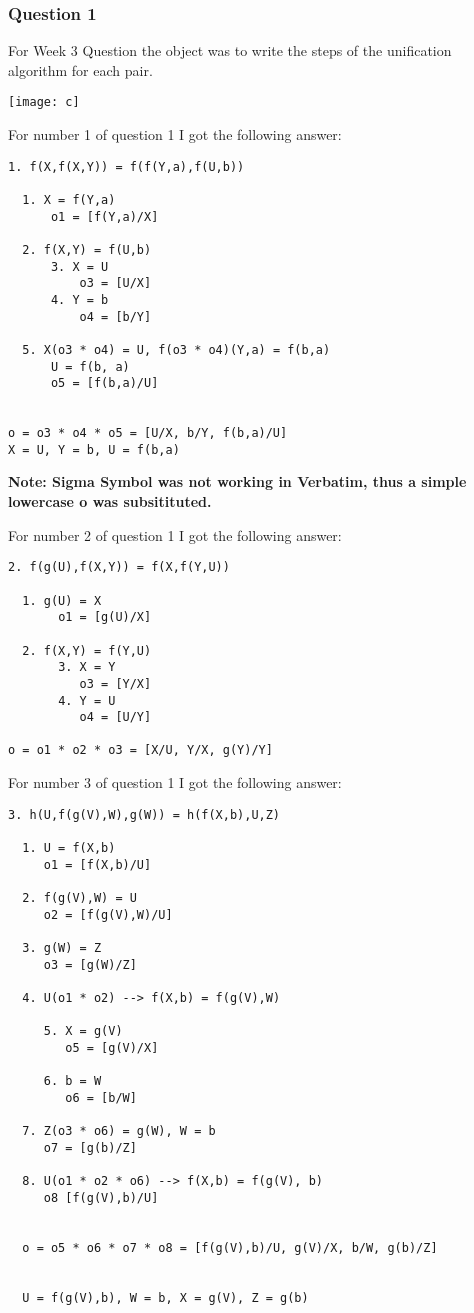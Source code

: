 \documentclass{article}
\theoremstyle{theorem}
\theoremstyle{definition}
\theoremstyle{remark}
\begin{document}
\subsubsection{Question 1}
For Week 3 Question the object was to write the steps of the unification algorithm for each pair. \newline

\texttt{[image: c]}\noindent\newline

\noindent\newline For number 1 of question 1 I got the following answer:

\begin{verbatim}
1. f(X,f(X,Y)) = f(f(Y,a),f(U,b))

  1. X = f(Y,a)
      o1 = [f(Y,a)/X]

  2. f(X,Y) = f(U,b)
      3. X = U
          o3 = [U/X]
      4. Y = b
          o4 = [b/Y]

  5. X(o3 * o4) = U, f(o3 * o4)(Y,a) = f(b,a)
      U = f(b, a)
      o5 = [f(b,a)/U]


o = o3 * o4 * o5 = [U/X, b/Y, f(b,a)/U]
X = U, Y = b, U = f(b,a)
\end{verbatim}

\noindent\textbf{Note: Sigma Symbol was not working in Verbatim, thus a simple lowercase o was subsitituted.}

\noindent\newline\newline For number 2 of question 1 I got the following answer:

\begin{verbatim}
2. f(g(U),f(X,Y)) = f(X,f(Y,U))

  1. g(U) = X
       o1 = [g(U)/X]

  2. f(X,Y) = f(Y,U)
       3. X = Y
          o3 = [Y/X]
       4. Y = U
          o4 = [U/Y]

o = o1 * o2 * o3 = [X/U, Y/X, g(Y)/Y]
\end{verbatim}

\noindent\newline\newline For number 3 of question 1 I got the following answer:
\begin{verbatim}
3. h(U,f(g(V),W),g(W)) = h(f(X,b),U,Z)

  1. U = f(X,b)
     o1 = [f(X,b)/U]

  2. f(g(V),W) = U
     o2 = [f(g(V),W)/U]

  3. g(W) = Z
     o3 = [g(W)/Z]

  4. U(o1 * o2) --> f(X,b) = f(g(V),W)

     5. X = g(V)
        o5 = [g(V)/X]

     6. b = W
        o6 = [b/W]

  7. Z(o3 * o6) = g(W), W = b
     o7 = [g(b)/Z]

  8. U(o1 * o2 * o6) --> f(X,b) = f(g(V), b)
     o8 [f(g(V),b)/U]


  o = o5 * o6 * o7 * o8 = [f(g(V),b)/U, g(V)/X, b/W, g(b)/Z]


  U = f(g(V),b), W = b, X = g(V), Z = g(b)
\end{verbatim}
\end{document}
